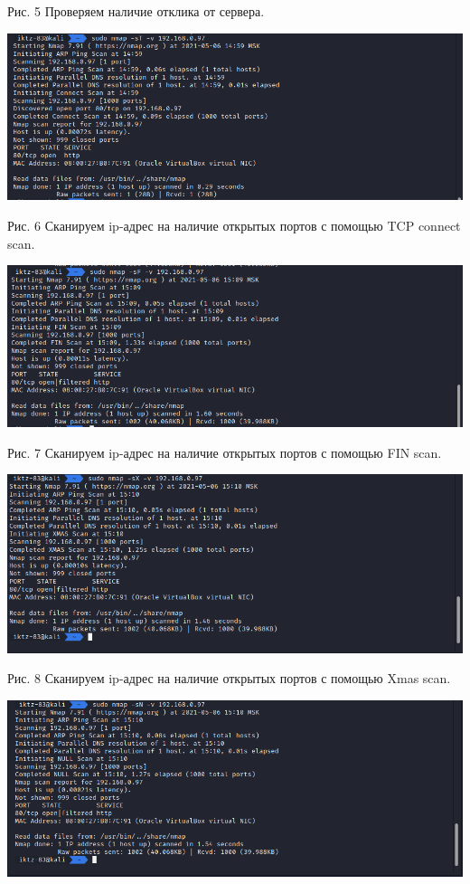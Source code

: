 \documentclass[a4paper,14pt]{extarticle}
\begin{document}
\begin{center}
        Рис. 5 Проверяем наличие отклика от сервера.
        \vspace{1ex}

        \includegraphics[scale=0.48]{pics/5.png}

        Рис. 6 Сканируем ip-адрес на наличие открытых портов с помощью TCP connect scan.
        \vspace{1ex}

        \includegraphics[scale=0.48]{pics/6.png}

        Рис. 7 Сканируем ip-адрес на наличие открытых портов с помощью FIN scan.
        \vspace{1ex}

        \includegraphics[scale=0.48]{pics/7.png}

        Рис. 8 Сканируем ip-адрес на наличие открытых портов с помощью Xmas scan.
        \vspace{1ex}

        \includegraphics[scale=0.48]{pics/8.png}


\end{center}
\end{document}
